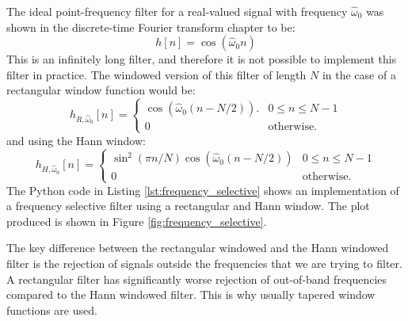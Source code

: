 The ideal point-frequency filter for a real-valued signal with frequency
$\hat{\omega}_0$ was shown in the discrete-time Fourier transform
chapter to be:
\begin{equation}
  h[n] = \cos(\hat{\omega}_0 n)
\end{equation}
This is an infinitely long filter, and therefore it is not possible to
implement this filter in practice. The windowed version of this filter
of length $N$ in the case of a rectangular window function would be:
\begin{equation}
h_{R,\hat{\omega}_0}[n] =\left\{ \begin{array}{cc}
\cos(\hat{\omega}_0 (n-N/2)). &   0 \le n \le N-1\\
0 & \mathrm{otherwise}.
\end{array}
\right.
\end{equation}
and using the Hann window:
\begin{equation}
h_{H,\hat{\omega}_0}[n] =\left\{ \begin{array}{cc}
\sin^2(\pi n/N)\cos(\hat{\omega}_0 (n-N/2)) &  0\le n \le N-1\\
0 & \mathrm{otherwise}.
\end{array}
\right.
\end{equation}
The Python code in Listing \ref{lst:frequency_selective} shows an
implementation of a frequency selective filter using a rectangular and
Hann window. The plot produced is shown in Figure
\ref{fig:frequency_selective}.

The key difference between the rectangular windowed and the Hann
windowed filter is the rejection of signals outside the frequencies that
we are trying to filter. A rectangular filter has significantly worse
rejection of out-of-band frequencies compared to the Hann windowed
filter. This is why usually tapered window functions are used.

